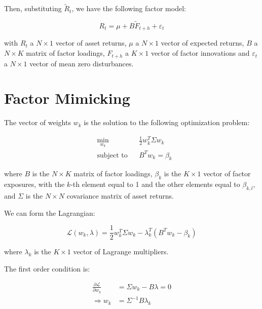 Then, substituting $\tilde{R}_t$, we have the following factor model:

\begin{equation}
    R_t = \mu + B \tilde{F}_{t+h} + \varepsilon_t
\end{equation}

with $R_t$ a $N \times 1$ vector of 
asset returns, $\mu$ a $N \times 1$ vector
of expected returns, $B$ a $N \times K$ matrix
of factor loadings, $F_{t+h}$ a $K \times 1$ vector
of factor innovations and $\varepsilon_t$ a $N \times 1$
vector of mean zero disturbances.



\section{Factor Mimicking}

The vector of weights $w_k$ 
is the solution to the following optimization problem:

\begin{equation}
    \begin{aligned}
        & \underset{w_k}{\min}
        & &  \frac{1}{2} w_k^T \Sigma w_k \\
        & \text{subject to}
        & & B^T w_k = \beta_k
    \end{aligned}
\end{equation}

where $B$ is the $N \times K$ matrix of factor loadings, $\beta_k$ is the $K \times 1$ vector of factor exposures,
with the $k$-th element equal to 1 and the other elements equal to $\beta_{k,l}$, 
and $\Sigma$ is the $N \times N$ covariance matrix of asset returns.

We can form the Lagrangian:

\begin{equation}
    \mathcal{L}(w_k, \lambda) = \frac{1}{2} w_k^T \Sigma w_k - \lambda_k^T (B^T w_k - \beta_k)
\end{equation}

where $\lambda_k$ is the $K \times 1$ vector of Lagrange multipliers.

The first order condition is:

\begin{equation}
    \begin{aligned}
        \frac{\partial \mathcal{L}}{\partial w_k} &= \Sigma w_k - B \lambda = 0 \\
        \Rightarrow w_k &= \Sigma^{-1} B \lambda_k
    \end{aligned}
\end{equation}

